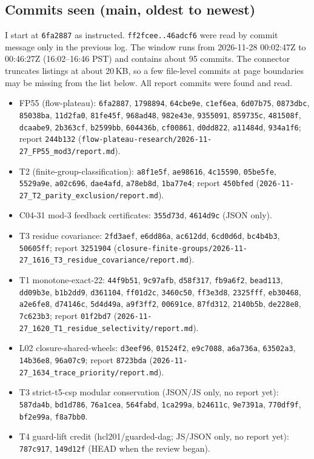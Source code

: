 \documentclass[11pt]{article}
\theoremstyle{definition}
\begin{document}
\subsection{Commits seen (main, oldest to newest)}
I start at \texttt{6fa2887} as instructed. \texttt{ff2fcee..46adcf6} were read by commit
message only in the previous log. The window runs from 2026-11-28 00:02:47Z to
00:46:27Z (16:02--16:46 PST) and contains about 95 commits. The connector truncates
listings at about 20\,KB, so a few file-level commits at page boundaries may be missing
from the list below. All report commits were found and read.
\begin{itemize}
\item FP55 (flow-plateau): \texttt{6fa2887}, \texttt{1798894}, \texttt{64cbe9e},
\texttt{c1ef6ea}, \texttt{6d07b75}, \texttt{0873dbc}, \texttt{85038ba}, \texttt{11d2fa0},
\texttt{81fe45f}, \texttt{968ad48}, \texttt{982e43e}, \texttt{9355091}, \texttt{859735c},
\texttt{481508f}, \texttt{dcaabe9}, \texttt{2b363cf}, \texttt{b2599bb}, \texttt{604436b},
\texttt{cf00861}, \texttt{d0dd822}, \texttt{a11484d}, \texttt{934a1f6}; report
\texttt{244b132} (\texttt{flow-plateau-research/2026-11-27\_FP55\_mod3/report.md}).
\item T2 (finite-group-classification): \texttt{a8f1e5f}, \texttt{ae98616},
\texttt{4c15590}, \texttt{05be5fe}, \texttt{5529a9e}, \texttt{a02c696}, \texttt{dae4afd},
\texttt{a78eb8d}, \texttt{1ba77e4}; report \texttt{450bfed}
(\texttt{2026-11-27\_T2\_parity\_exclusion/report.md}).
\item C04-31 mod-3 feedback certificates: \texttt{355d73d}, \texttt{4614d9c} (JSON only).
\item T3 residue covariance: \texttt{2fd3aef}, \texttt{e6dd86a}, \texttt{ac612dd},
\texttt{6cd0d6d}, \texttt{bc4b4b3}, \texttt{50605ff}; report \texttt{3251904}
(\texttt{closure-finite-groups/2026-11-27\_1616\_T3\_residue\_covariance/report.md}).
\item T1 monotone-exact-22: \texttt{44f9b51}, \texttt{9c97afb}, \texttt{d58f317},
\texttt{fb9a6f2}, \texttt{bead113}, \texttt{dd09b3e}, \texttt{b1b2dd9}, \texttt{d361104},
\texttt{ff01d2c}, \texttt{3460c50}, \texttt{ff3e3d8}, \texttt{2325fff}, \texttt{eb30468},
\texttt{a2e6fe8}, \texttt{d74146c}, \texttt{5d4d49a}, \texttt{a9f3ff2}, \texttt{00691ce},
\texttt{87fd312}, \texttt{2140b5b}, \texttt{de228e8}, \texttt{7c623b3}; report
\texttt{01f2bd7} (\texttt{2026-11-27\_1620\_T1\_residue\_selectivity/report.md}).
\item L02 closure-shared-wheels: \texttt{d3eef96}, \texttt{01524f2}, \texttt{e9c7088},
\texttt{a6a736a}, \texttt{63502a3}, \texttt{14b36e8}, \texttt{96a07c9}; report
\texttt{8723bda} (\texttt{2026-11-27\_1634\_trace\_priority/report.md}).
\item T3 strict-t5-csp modular conservation (JSON/JS only, no report yet):
\texttt{587da4b}, \texttt{bd1d786}, \texttt{76a1cea}, \texttt{564fabd}, \texttt{1ca299a},
\texttt{b24611c}, \texttt{9e7391a}, \texttt{770df9f}, \texttt{bf2e99a}, \texttt{f8a7bb0}.
\item T4 guard-lift credit (hcl201/guarded-dag; JS/JSON only, no report yet):
\texttt{787c917}, \texttt{149d12f} (HEAD when the review began).
\end{itemize}
\end{document}
